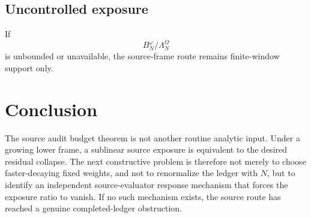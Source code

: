 \documentclass[11pt]{article}
\begin{document}
\subsection*{Uncontrolled exposure}
If
\[
  B_N^\omega/\Lambda_N^\Omega
\]
is unbounded or unavailable, the source-frame route remains finite-window support only.

\section{Conclusion}
The source audit budget theorem is not another routine analytic input.  Under a growing lower frame, a sublinear source exposure is equivalent to the desired residual collapse.  The next constructive problem is therefore not merely to choose faster-decaying fixed weights, and not to renormalize the ledger with \(N\), but to identify an independent source-evaluator response mechanism that forces the exposure ratio to vanish.  If no such mechanism exists, the source route has reached a genuine completed-ledger obstruction.
\end{document}
